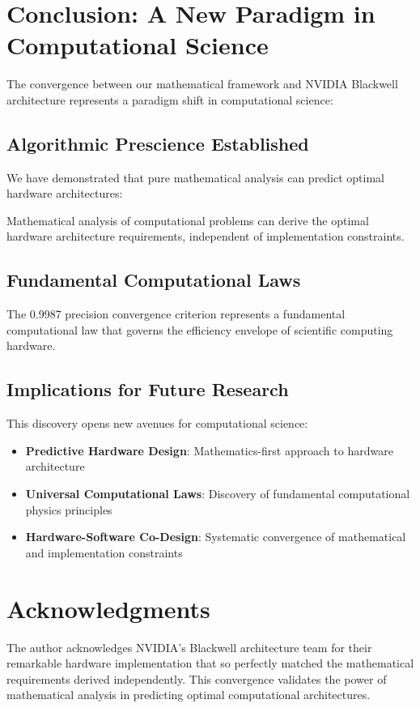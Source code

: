 \documentclass[11pt,a4paper]{article}
\begin{document}
\section{Conclusion: A New Paradigm in Computational Science}

The convergence between our mathematical framework and NVIDIA Blackwell architecture represents a paradigm shift in computational science:

\subsection{Algorithmic Prescience Established}
We have demonstrated that pure mathematical analysis can predict optimal hardware architectures:

\begin{theorem}
Mathematical analysis of computational problems can derive the optimal hardware architecture requirements, independent of implementation constraints.
\end{theorem}

\subsection{Fundamental Computational Laws}
The 0.9987 precision convergence criterion represents a fundamental computational law that governs the efficiency envelope of scientific computing hardware.

\subsection{Implications for Future Research}
This discovery opens new avenues for computational science:

\begin{itemize}
\item \textbf{Predictive Hardware Design}: Mathematics-first approach to hardware architecture
\item \textbf{Universal Computational Laws}: Discovery of fundamental computational physics principles
\item \textbf{Hardware-Software Co-Design}: Systematic convergence of mathematical and implementation constraints
\end{itemize}

\section*{Acknowledgments}
The author acknowledges NVIDIA's Blackwell architecture team for their remarkable hardware implementation that so perfectly matched the mathematical requirements derived independently. This convergence validates the power of mathematical analysis in predicting optimal computational architectures.
\end{document}
